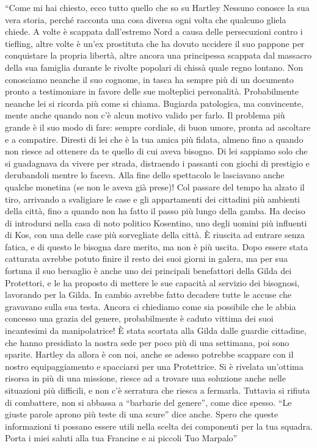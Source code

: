 ``Come mi hai chiesto, ecco tutto quello che so su Hartley Nessuno
conosce la sua vera storia, perché racconta una cosa diversa ogni volta
che qualcuno gliela chiede. A volte è scappata dall'estremo Nord a causa
delle persecuzioni contro i tiefling, altre volte è un'ex prostituta che
ha dovuto uccidere il suo pappone per conquistare la propria libertà,
altre ancora una principessa scappata dal massacro della sua famiglia
durante le rivolte popolari di chissà quale regno lontano. Non
conosciamo neanche il suo cognome, in tasca ha sempre più di un
documento pronto a testimoniare in favore delle sue molteplici
personalità. Probabilmente neanche lei si ricorda più come si chiama.
Bugiarda patologica, ma convincente, mente anche quando non c'è alcun
motivo valido per farlo. Il problema più grande è il suo modo di fare:
sempre cordiale, di buon umore, pronta ad ascoltare e a compatire.
Diresti di lei che è la tua amica più fidata, almeno fino a quando non
riesce ad ottenere da te quello di cui aveva bisogno. Di lei sappiamo
solo che si guadagnava da vivere per strada, distraendo i passanti con
giochi di prestigio e derubandoli mentre lo faceva. Alla fine dello
spettacolo le lasciavano anche qualche monetina (se non le aveva già
prese)! Col passare del tempo ha alzato il tiro, arrivando a svaligiare
le case e gli appartamenti dei cittadini più ambienti della città, fino
a quando non ha fatto il passo più lungo della gamba. Ha deciso di
introdursi nella casa di noto politico Kosentino, uno degli uomini più
influenti di Kos, con una delle case più sorvegliate della città. È
riuscita ad entrare senza fatica, e di questo le bisogna dare merito, ma
non è più uscita. Dopo essere stata catturata avrebbe potuto finire il
resto dei suoi giorni in galera, ma per sua fortuna il suo bersaglio è
anche uno dei principali benefattori della Gilda dei Protettori, e le ha
proposto di mettere le sue capacità al servizio dei bisognosi, lavorando
per la Gilda. In cambio avrebbe fatto decadere tutte le accuse che
gravavano sulla sua testa. Ancora ci chiediamo come sia possibile che le
abbia concesso una grazia del genere, probabilmente è caduto vittima dei
suoi incantesimi da manipolatrice! È stata scortata alla Gilda dalle
guardie cittadine, che hanno presidiato la nostra sede per poco più di
una settimana, poi sono sparite. Hartley da allora è con noi, anche se
adesso potrebbe scappare con il nostro equipaggiamento e spacciarsi per
una Protettrice. Si è rivelata un'ottima risorsa in più di una missione,
riesce ad a trovare una soluzione anche nelle situazioni più difficili,
e non c'è serratura che riesca a fermarla. Tuttavia si rifiuta di
combattere, non si abbassa a ``barbarie del genere'', come dice spesso.
``Le giuste parole aprono più teste di una scure'' dice anche. Spero che
queste informazioni ti possano essere utili nella scelta dei componenti
per la tua squadra. Porta i miei saluti alla tua Francine e ai piccoli
Tuo Marpalo''


